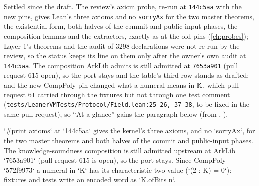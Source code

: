 
\begin{sloppypar}
Settled since the draft. The review's axiom probe, re-run at \texttt{144c5aa} with the new pins, gives Lean's three axioms and no \texttt{sorryAx} for the two master theorems, the existential form, both halves of the commit and public-input phases, the composition lemmas and the extractors, exactly as at the old pins (\cref{ch:probes}); Layer 1's theorems and the audit of 3298 declarations were not re-run by the review, so the status keeps its line on them only after the owner's own audit at \texttt{144c5aa}. The composition ArkLib admits is still admitted at \texttt{7653a901} (pull request 615 open), so the port stays and the table's third row stands as drafted; and the new CompPoly pin changed what a numeral means in $\mathbb{K}$, which pull request 61 carried through the fixtures but not through one test comment (\texttt{tests/\allowbreak{}Leaner\allowbreak{}VMTests/\allowbreak{}Protocol/\allowbreak{}Field.\allowbreak{}lean:\allowbreak{}25-\allowbreak{}26,\allowbreak{} 37-\allowbreak{}38}, to be fixed in the same pull request), so ``At a glance'' gains the paragraph below (from , ).
\end{sloppypar}

\begin{srccode}
`#print axioms` at `144c5aa` gives the kernel's three axioms, and no `sorryAx`, for the two
master theorems and both halves of the commit and public-input phases. The knowledge-soundness
composition is still admitted upstream at ArkLib `7653a901` (pull request 615 is open), so the
port stays. Since CompPoly `572f9973` a numeral in `K` has its characteristic-two value
(`(2 : K) = 0`): fixtures and tests write an encoded word as `K.ofBits n`.
\end{srccode}

